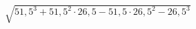 \begin{ex}[type=calculate]
	\begin{condition}
		\( \sqrt{51,5^3+51,5^2\cdot26,5-51,5\cdot26,5^2-26,5^3} \)
	\end{condition}
\end{ex}